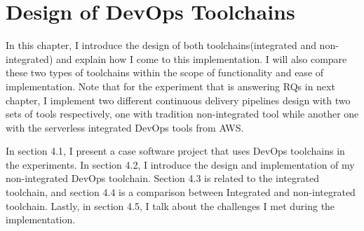 \chapter{Design of DevOps Toolchains}
In this chapter, I introduce the design of both toolchains(integrated and non-integrated) and explain how I come to this implementation. I will also compare these two types of toolchains within the scope of functionality and ease of implementation.
Note that for the experiment that is answering RQs in next chapter, I implement two different continuous delivery pipelines design with two sets of tools respectively, one with tradition non-integrated tool while another one with the serverless integrated DevOps tools from AWS.
\par
In section 4.1, I present a case software project that uses DevOps toolchains in the experiments. In section 4.2, I introduce the design and implementation of my non-integrated DevOps toolchain. Section 4.3 is related to the integrated toolchain, and section 4.4 is a comparison between Integrated and non-integrated toolchain. Lastly, in section 4.5, I talk about the challenges I met during the implementation.
